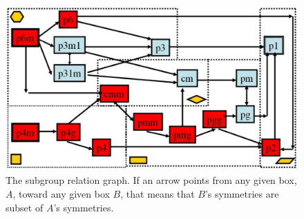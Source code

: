 \begin{figure}[!ht]
\centering
\includegraphics[width=0.9\columnwidth]{Yanxi_Graph}
\caption{The subgroup relation graph. If an arrow points from any given box, $A$, toward any given box $B$, that means that $B$'s symmetries are subset of $A$'s symmetries.}
\label{graph}
\end{figure}